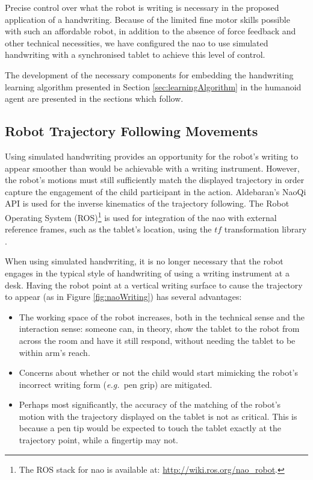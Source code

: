 \documentclass{sig-alternate}
\newcommand{\eg}{{\textit{e.g.~}}}
\begin{document}
Precise control over what the robot is writing is necessary in the
proposed application of a handwriting. Because
of the limited fine motor skills possible with such an affordable robot, in
addition to the absence of force feedback and other technical necessities, we
have configured the {\sc nao} to use simulated handwriting with a synchronised tablet
to achieve this level of control. 

The development of the necessary components for embedding the handwriting learning
algorithm presented in Section \ref{sec:learningAlgorithm} in the humanoid agent
are presented in the sections which follow.

\subsection{Robot Trajectory Following Movements}

Using simulated handwriting provides an opportunity for the robot's writing to
appear smoother than would be achievable with a writing instrument. However, the
robot's motions must still sufficiently match the displayed trajectory in order
capture the engagement of the child participant in the action. Aldebaran's NaoQi API
is used for the inverse kinematics of the trajectory following. The Robot
Operating System (ROS)\footnote{The ROS stack for {\sc nao} is available at:
\url{http://wiki.ros.org/nao_robot}.} is used for integration of the {\sc nao}
with external reference frames, such as the tablet's location, 
using the $tf$ transformation library \cite{Foote2013}.

When using simulated handwriting, it is no longer necessary that the robot
engages in the typical style of handwriting of using a writing instrument at a desk.
Having the robot point at a vertical writing surface to cause the
trajectory to appear (as in Figure \ref{fig:naoWriting}) has several
advantages:

\begin{itemize}

    \item The working space of the robot increases, both in the technical sense
        and the interaction sense: someone can, in theory, show the tablet to
        the robot from across the room and have it still respond, without
        needing the tablet to be within arm's reach.

    \item Concerns about whether or not the child would start mimicking the
        robot's incorrect writing form (\eg pen grip) are mitigated. 

    \item Perhaps most significantly, the accuracy of the matching of the
        robot's motion with the trajectory displayed on the tablet is not as
        critical. This is because a pen tip would be expected to touch the
        tablet exactly at the trajectory point, while a fingertip may not.

\end{itemize}
\end{document}
